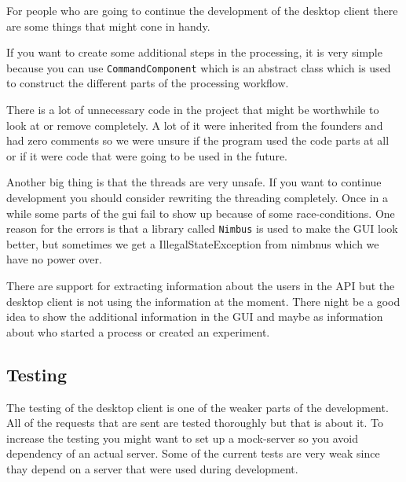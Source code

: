 For people who are going to continue the development of the desktop client there are some things that might cone in handy.

If you want to create some additional steps in the processing, it is very simple because you can use \texttt{CommandComponent} which is an abstract class which is used to construct the different parts of the processing workflow.

There is a lot of unnecessary code in the project that might be worthwhile to look at or remove completely. A lot of it were inherited from the founders and had zero comments so we were unsure if the program used the code parts at all or if it were code that were going to be used in the future.

Another big thing is that the threads are very unsafe. If you want to continue development you should consider rewriting the threading completely. Once in a while some parts of the gui fail to show up because of some race-conditions. One reason for the errors is that a library called \texttt{Nimbus} is used to make the GUI look better, but sometimes we get a IllegalStateException from nimbnus which we have no power over.

 There are support for extracting information about the users in the API but the desktop client is not using the information at the moment. There night be a good idea to show the additional information in the GUI and maybe as information about who started a process or created an experiment.

\subsection{Testing}
The testing of the desktop client is one of the weaker parts of the development. All of the requests that are sent are tested thoroughly but that is about it. To increase the testing you might want to set up a mock-server so you avoid dependency of an actual server. Some of the current tests are very weak since thay depend on a server that were used during development. 
